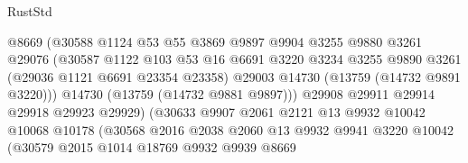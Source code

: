 \begin{lexlean}{RustStd}
\begin{coremodule}
                                  @8669
                                  (@30588
                                    @1124
                                    @53
                                    @55
                                    @3869
                                    @9897
                                    @9904
                                    @3255
                                    @9880
                                    @3261
                                    @29076
                                    (@30587
                                      @1122
                                      @103
                                      @53
                                      @16
                                      @6691
                                      @3220
                                      @3234
                                      @3255
                                      @9890
                                      @3261
                                      (@29036 @1121 @6691 @23354 @23358)
                                      @29003
                                      @14730
                                      (@13759 (@14732 @9891 @3220)))
                                    @14730
                                    (@13759 (@14732 @9881 @9897)))
                                  @29908
                                  @29911
                                  @29914
                                  @29918
                                  @29923
                                  @29929)
                                (@30633
                                  @9907
                                  @2061
                                  @2121
                                  @13
                                  @9932
                                  @10042
                                  @10068
                                  @10178
                                  (@30568
                                    @2016
                                    @2038
                                    @2060
                                    @13
                                    @9932
                                    @9941
                                    @3220
                                    @10042
                                    (@30579
                                      @2015
                                      @1014
                                      @18769
                                      @9932
                                      @9939
                                      @8669

\end{coremodule}
\end{lexlean}
